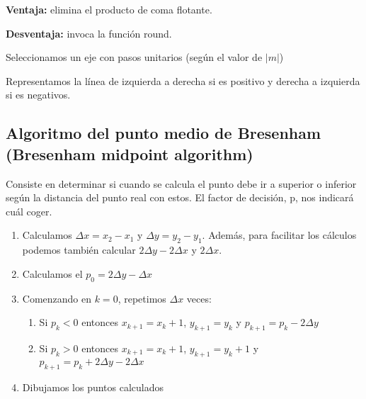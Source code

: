 \textbf{Ventaja:} elimina el producto de coma flotante.

\textbf{Desventaja:} invoca la función round.

Seleccionamos un eje con pasos unitarios (según el valor de $|m|$)

Representamos la línea de izquierda a derecha si es positivo y derecha a izquierda  si es negativos.

\subsection{Algoritmo del punto medio de Bresenham (Bresenham midpoint algorithm)}
Consiste en determinar si cuando se calcula el punto debe ir a superior o inferior según la distancia del punto real con estos. El factor de decisión, p, nos indicará cuál coger.

\begin{enumerate}
    \item Calculamos $\Delta x = x_2 -x_1$ y $\Delta y = y_2 -y_1$. Además, para facilitar los cálculos podemos también calcular $2\Delta y - 2 \Delta x$ y $2 \Delta x$.
    \item Calculamos el $p_0=2\Delta y - \Delta x$
    \item Comenzando en $k=0$, repetimos $\Delta x$ veces:
    \begin{enumerate}
        \item Si $p_k < 0$ entonces $x_{k+1}=x_k+1$, $y_{k+1}=y_k$ y $p_{k+1}=p_k-2\Delta y$
        \item Si $p_k > 0$ entonces $x_{k+1}=x_k+1$, $y_{k+1}=y_k+1$ y $p_{k+1}=p_k+2\Delta y - 2 \Delta x$
    \end{enumerate}
    \item Dibujamos los puntos calculados
\end{enumerate}
